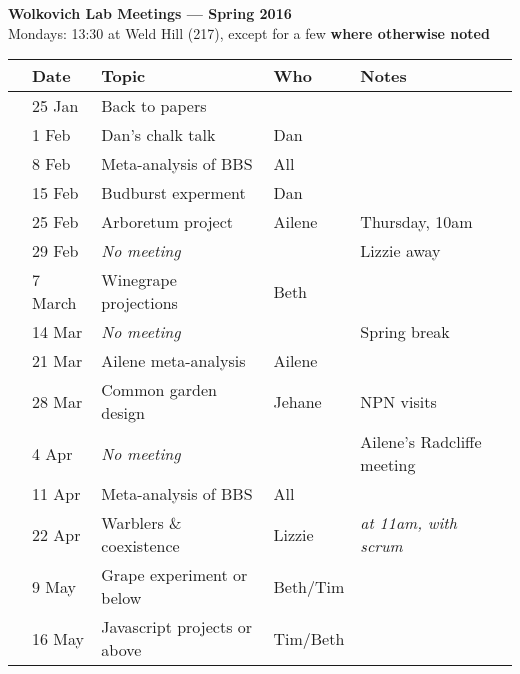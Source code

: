 \documentclass[11pt]{article}
\begin{document}
 
\raggedright
{}

\begin{center} 
{\large \textbf{Wolkovich Lab Meetings --- Spring 2016}} \\ [2pt]
Mondays: 13:30 at Weld Hill (217), except for a few {\bf where otherwise noted}\\
\end{center} 

\begin{center}
\begin{tabular}{ p{0.2 cm}  p{2 cm}  p{5 cm}  p{2 cm}  p{4 cm} }  \hline \hline
 & \textbf{Date}
   & \textbf{Topic}
      & \textbf{Who} 
         & \textbf{Notes} \\ 
\hline \hline
 & 25 Jan & Back to papers &        & \\\hline
 & 1 Feb  & Dan's chalk talk & Dan &  \\\hline
 & 8 Feb & Meta-analysis of BBS & All      &  \\\hline
 & 15 Feb & Budburst experment & Dan      &  \\\hline 
& 25 Feb & Arboretum project &   Ailene   &  Thursday, 10am  \\\hline
 & 29 Feb & \emph{No meeting} & & Lizzie away  \\\hline
 & 7 March & Winegrape projections & Beth &  \\\hline
 & 14 Mar & \emph{No meeting} & &  Spring break \\\hline
 & 21 Mar & Ailene meta-analysis & Ailene      &  \\\hline 
 & 28 Mar & Common garden design &  Jehane    &NPN visits   \\\hline  
 & 4 Apr & \emph{No meeting} &   &  Ailene's Radcliffe meeting\\\hline 
 & 11 Apr & Meta-analysis of BBS &   All   &  \\\hline 
 & 22 Apr & Warblers \& coexistence &  Lizzie     & \emph{at 11am, with scrum}  \\\hline 
 & 9 May & Grape experiment or below &  Beth/Tim     & \\\hline 
 & 16 May & Javascript projects or above & Tim/Beth   &  \\\hline 
\hline
\end{tabular}
\end{center}
\vspace{6pt}
\end{document}
